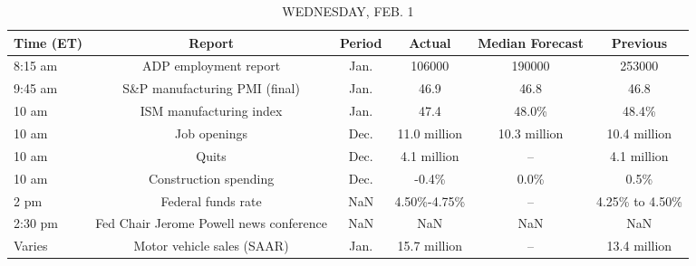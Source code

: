 \documentclass{article}%
\begin{document}
\begin{table}[htbp]%
\caption{WEDNESDAY, FEB. 1}%
\centering%
\begin{adjustbox}{width=1\textwidth}%
\begin{tabular}{lccccc}
\toprule
Time (ET) &                                  Report & Period &       Actual & Median Forecast &       Previous \\
\midrule
  8:15 am &                   ADP employment report &   Jan. &       106000 &          190000 &         253000 \\
  9:45 am &           S\&P manufacturing PMI (final) &   Jan. &         46.9 &            46.8 &           46.8 \\
    10 am &                 ISM manufacturing index &   Jan. &         47.4 &           48.0\% &          48.4\% \\
    10 am &                            Job openings &   Dec. & 11.0 million &    10.3 million &   10.4 million \\
    10 am &                                   Quits &   Dec. &  4.1 million &              -- &    4.1 million \\
    10 am &                   Construction spending &   Dec. &        -0.4\% &            0.0\% &           0.5\% \\
     2 pm &                      Federal funds rate &    NaN &  4.50\%-4.75\% &              -- & 4.25\% to 4.50\% \\
  2:30 pm & Fed Chair Jerome Powell news conference &    NaN &          NaN &             NaN &            NaN \\
   Varies &              Motor vehicle sales (SAAR) &   Jan. & 15.7 million &              -- &   13.4 million \\
\bottomrule
\end{tabular}
%
\end{adjustbox}%
\end{table}

%
\end{document}
